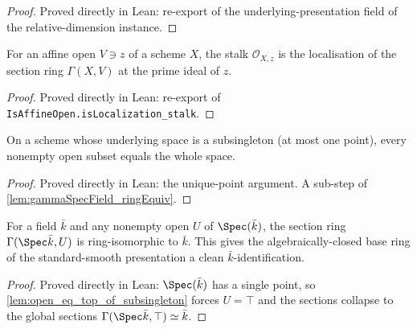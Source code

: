 \begin{proof}
  Proved directly in Lean: re-export of the underlying-presentation field of the
  relative-dimension instance.
\end{proof}

\begin{lemma}
  \label{lem:isLocalization_atPrime_stalk_of_affineOpen}
  For an affine open \(V \ni z\) of a scheme \(X\), the stalk \(\mathcal O_{X,z}\) is
  the localisation of the section ring \(\Gamma(X, V)\) at the prime ideal of \(z\).
\end{lemma}

\begin{proof}
  Proved directly in Lean: re-export of \texttt{IsAffineOpen.isLocalization\_stalk}.
\end{proof}

\begin{lemma}
  \label{lem:open_eq_top_of_subsingleton}
  On a scheme whose underlying space is a subsingleton (at most one point), every
  nonempty open subset equals the whole space.
\end{lemma}

\begin{proof}
  Proved directly in Lean: the unique-point argument. A sub-step of
  \cref{lem:gammaSpecField_ringEquiv}.
\end{proof}

\begin{lemma}
  \label{lem:gammaSpecField_ringEquiv}
  For a field \(\bar k\) and any nonempty open \(U\) of \(\Spec(\bar k)\), the section
  ring \(\Gamma(\Spec \bar k, U)\) is ring-isomorphic to \(\bar k\). This gives the
  algebraically-closed base ring of the standard-smooth presentation a clean
  \(\bar k\)-identification.
\end{lemma}

\begin{proof}
  Proved directly in Lean: \(\Spec(\bar k)\) has a single point, so
  \cref{lem:open_eq_top_of_subsingleton} forces \(U = \top\) and the sections collapse
  to the global sections \(\Gamma(\Spec \bar k, \top) \simeq \bar k\).
\end{proof}

